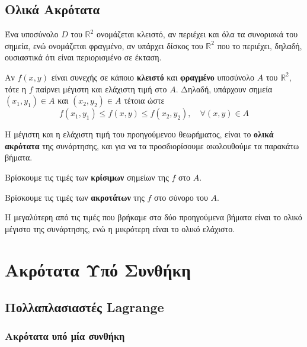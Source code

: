 \section{Ολικά Ακρότατα}

Ένα υποσύνολο $D$ του $ \mathbb{R}^{2} $ ονομάζεται \textcolor{Col1}{κλειστό}, αν 
περιέχει και όλα τα συνοριακά του σημεία, ενώ ονομάζεται \textcolor{Col1}{φραγμένο}, αν 
υπάρχει δίσκος του $ \mathbb{R}^{2} $ που το περιέχει, δηλαδή, ουσιαστικά ότι είναι 
περιορισμένο σε έκταση.

\begin{thm}
  Αν $f(x,y)$ είναι συνεχής σε κάποιο \textbf{κλειστό} και \textbf{φραγμένο} υποσύνολο 
  $A$ του $ \mathbb{R}^{2} $, τότε η $f$ παίρνει μέγιστη και ελάχιστη τιμή στο $A$. 
  Δηλαδή, υπάρχουν σημεία $ (x_{1}, y_{1}) \in A $ και $ (x_{2}, y_{2}) \in A $ τέτοια 
  ώστε 
  \[
    f(x_{1}, y_{1}) \leq f(x,y) \leq f(x_{2}, y_{2}), \quad \forall (x,y) \in A
  \]
\end{thm}

Η μέγιστη και η ελάχιστη τιμή του προηγούμενου θεωρήματος, είναι το \textbf{ολικά
ακρότατα} της συνάρτησης, και για να τα προσδιορίσουμε ακολουθούμε τα παρακάτω βήματα.

\begin{myitemize}
  \item Βρίσκουμε τις τιμές των \textbf{κρίσιμων} σημείων της $f$ στο $A$.
  \item Βρίσκουμε τις τιμές των \textbf{ακροτάτων} της $f$ στο σύνορο του $A$. 
  \item Η μεγαλύτερη από τις τιμές που βρήκαμε στα δύο προηγούμενα βήματα 
    είναι το ολικό μέγιστο της συνάρτησης, ενώ η μικρότερη είναι το ολικό ελάχιστο.
\end{myitemize}




\chapter{Ακρότατα Υπό Συνθήκη}

\section{Πολλαπλασιαστές Lagrange}

\subsection{Ακρότατα υπό μία συνθήκη}

\enlargethispage{2\baselineskip}

